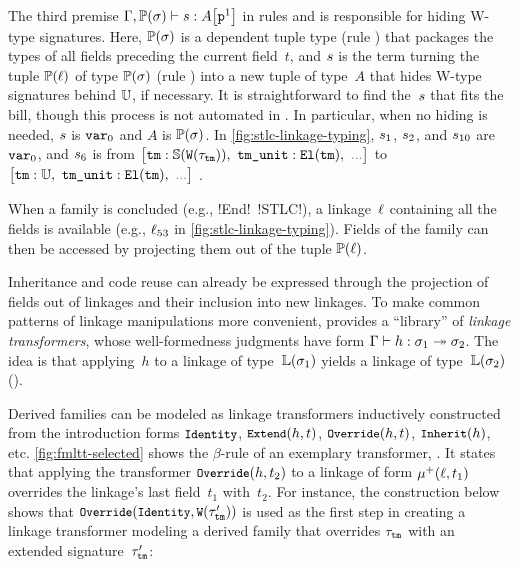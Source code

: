 The third premise
$ {\Gamma,\mathbb{P}({\sigma})} \vdash {\ensuremath{s}} : {{A}\!\left[{\texttt{p}^{1}}\right]} $
in rules  and  is
responsible for hiding W-type signatures.
Here, $\mathbb{P}({\sigma})$ is a dependent tuple type (rule )
that packages the types of all fields preceding the current field~$t$,
and $s$ is the term turning the tuple $\mathbb{P}({\ell})$ of type
$\mathbb{P}({\sigma})$ (rule ) into a new tuple of type~$A$
that hides W-type signatures behind $\mathbb{U}$, if necessary.
%
It is straightforward to find the~$s$ that fits the bill, though this process
is not automated in \TT.
In particular, when no hiding is needed, $s$ is $\texttt{var}_{0}$
and $A$ is $\mathbb{P}({\sigma})$.
In \cref{fig:stlc-linkage-typing}, $s_1$, $s_2$, and $s_{10}$ are $\texttt{var}_{0}$,
and $s_6$ is from
\begingroup
\fontsize{9}{9}\selectfont%
$\big[\texttt{tm} : \TyS{\wcode{\wsig_{\texttt{tm}}}},\ \texttt{tm\_unit} : \El{\texttt{tm}},\ \dadada\big]$
\endgroup
to
\begingroup
\fontsize{9}{9}\selectfont%
$\big[\texttt{tm} : \cU,\ \texttt{tm\_unit} : \El{\texttt{tm}},\ \dadada\big]$%
\endgroup
.

When a family is concluded (e.g., \lsti!End!~\lsti!STLC!),
a linkage~$\ell$ containing all the fields is available
(e.g., $\ell_{53}$ in \cref{fig:stlc-linkage-typing}).
Fields of the family can then be accessed by projecting them out of the tuple
$\mathbb{P}({\ell})$.



Inheritance and code reuse can already be expressed through the projection
of fields out of linkages and their inclusion into new linkages.
To make common patterns of linkage manipulations more convenient,
\TT provides a ``library'' of \emph{linkage transformers}, whose well-formedness judgments
have form $ {\Gamma} \vdash {h} : {\sigma_1} \twoheadrightarrow {\ensuremath{\sigma}_2}$. The idea is that
applying~$h$ to a linkage of type~$\mathbb{L}({\sigma_1})$ yields a linkage of
type~$\mathbb{L}({\sigma_2})$ ().

Derived families can be modeled as linkage transformers inductively
constructed from the introduction forms
$\small\texttt{Identity}$, $\small\texttt{Extend}({h},{t})$, $\small\texttt{Override}({h},{t})$, $\small\texttt{Inherit}({h})$, etc.
\cref{fig:fmltt-selected} shows the $\beta$-rule of an exemplary transformer,
.
It states that applying the transformer $\small\texttt{Override}({h},{t_2})$ to
a linkage of form $\mu^+({\ell},{t_1})$
overrides the linkage's last field~$t_1$ with~$t_2$.
For instance, the construction below shows that 
$\small\texttt{Override}({\texttt{Identity}},{\texttt{W}({\tau'_{\texttt{tm}}})})$
is used as the first step in creating a linkage transformer modeling a derived family that
overrides $\tau_{\texttt{tm}}$ with an extended
signature~$\tau'_{\texttt{tm}}$:
\vspace{.9ex}

